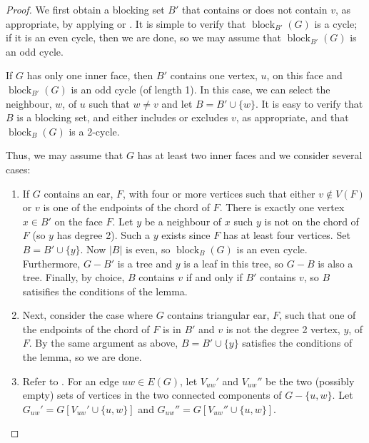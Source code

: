 \documentclass{patmorin}
\DeclareMathOperator{\block}{block}
\begin{document}
\begin{proof}
  We first obtain a blocking set $B'$ that contains or does not
  contain $v$, as appropriate, by applying  or
  . It is simple to verify that $\block_{B'}(G)$
  is a cycle;  if it is an even cycle, then we are done, so we may assume
  that $\block_{B'}(G)$ is an odd cycle.

  If $G$ has only one inner face, then $B'$ contains one vertex,
  $u$, on this face and $\block_{B'}(G)$ is an odd cycle (of length 1).
  In this case, we can select the neighbour, $w$, of $u$ such that
  $w\neq v$ and let $B=B'\cup\{w\}$.  It is easy to verify that $B$ is
  a blocking set, and either includes or excludes $v$, as appropriate,
  and that $\block_B(G)$ is a 2-cycle.

  Thus, we may assume that $G$ has at least two inner faces and we
  consider several cases:
 
  \begin{enumerate}
  \item If $G$ contains an ear, $F$, with four or more vertices such
  that either $v\not\in V(F)$ or $v$ is one of the endpoints of the
  chord of $F$. There is exactly one vertex $x\in B'$ on the face $F$.
  Let $y$ be a neighbour of $x$ such $y$ is not on the chord of $F$
  (so $y$ has degree 2). Such a $y$ exists since $F$ has at least four
  vertices.  Set $B=B'\cup \{y\}$.  Now $|B|$ is even, so $\block_B(G)$
  is an even cycle.  Furthermore, $G-B'$ is a tree and $y$
  is a leaf in this tree, so $G-B$ is also a tree.  Finally,
  by choice, $B$ contains $v$ if and only if $B'$ contains $v$, so $B$
  satisifies the conditions of the lemma.

  \item Next, consider the case where $G$ contains triangular ear, $F$,
  such that one of the endpoints of the chord of $F$ is in $B'$ and $v$
  is not the degree 2 vertex, $y$, of $F$.  By the same argument as above,
  $B=B'\cup\{y\}$ satisfies the conditions of the lemma, so we are done.

  \item Refer to . 
  For an edge $uw\in E(G)$, let $V_{uw}'$ and $V_{uw}''$ be the two
  (possibly empty) sets of vertices in the two connected components
  of $G-\{u,w\}$.  Let $G_{uw}'=G[V_{uw}'\cup\{u,w\}]$ and
  $G_{uw}''=G[V_{uw}''\cup\{u,w\}]$.


\end{enumerate}
\end{proof}
\end{document}
